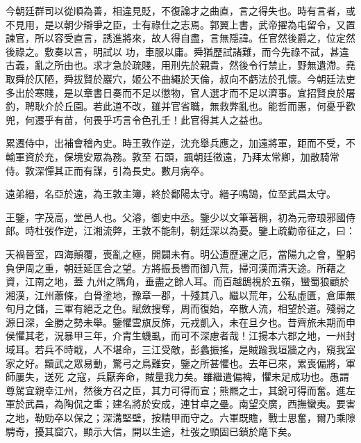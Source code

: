\begin{pinyinscope}
 今朝廷群司以從順為善，相違見貶，不復論才之曲直，言之得失也。時有言者，或不見用，是以朝少辯爭之臣，士有祿仕之志焉。郭翼上書，武帝擢為屯留令，又置諫官，所以容受直言，誘進將來，故人得自盡，言無隱諱。任官然後爵之，位定然後祿之。敷奏以言，明試以
 功，車服以庸。舜猶歷試諸難，而今先祿不試，甚違古義，亂之所由也。求才急於疏賤，用刑先於親貴，然後令行禁止，野無遺滯。堯取舜於仄陋，舜拔賢於巖穴，姬公不曲繩於天倫，叔向不虧法於孔懷。今朝廷法吏多出於寒賤，是以章書日奏而不足以懲物，官人選才而不足以濟事。宜招賢良於屠釣，聘耿介於丘園。若此道不改，雖并官省職，無救弊亂也。能哲而惠，何憂乎歡兜，何遷乎有苗，何畏乎巧言令色孔壬！此官得其人之益也。



 累遷侍中，出補會稽內史。時王敦作逆，沈充舉兵應之，加遠將軍，距而不受，不輸軍資於充，保境安眾為務。敦至
 石頭，諷朝廷徵遠，乃拜太常卿，加散騎常侍。敦深憚其正而有謀，引為長史。數月病卒。



 遠弟縉，名亞於遠，為王敦主簿，終於鄱陽太守。縉子鳴鵠，位至武昌太守。



 王鑒，字茂高，堂邑人也。父濬，御史中丞。鑒少以文筆著稱，初為元帝琅邪國侍郎。時杜弢作逆，江湘流弊，王敦不能制，朝廷深以為憂。鑒上疏勸帝征之，曰：



 天禍晉室，四海顛覆，喪亂之極，開闢未有。明公遭歷運之厄，當陽九之會，聖躬負伊周之重，朝廷延匡合之望。方將振長轡而御八荒，掃河漢而清天途。所藉之資，江南之地，蓋
 九州之隅角，垂盡之餘人耳。而百越鴟視於五嶺，蠻蜀狼顧於湘漢，江州蕭條，白骨塗地，豫章一郡，十殘其八。繼以荒年，公私虛匱，倉庫無旬月之儲，三軍有絕乏之色。賦斂搜奪，周而復始，卒散人流，相望於道。殘弱之源日深，全勝之勢未舉。鑒懼雲旗反旆，元戎凱入，未在旦夕也。昔齊旅未期而申侯懼其老，況暴甲三年，介胄生蟣虱，而可不深慮者哉！江揚本六郡之地，一州封域耳。若兵不時戢，人不堪命，三江受敵，彭蠡振搖，是賊踰我垣牆之內，窺我室家之好。黷武之眾易動，驚弓之鳥難安，鑒之所甚懼也。去年已來，累喪偏將，軍師屢失，送死
 之寇，兵厭奔命，賊量我力矣。雖繼遣偏裨，懼未足成功也。愚謂尊駕宜親幸江州，然後方召之臣，其力可得而宣；熊羆之士，其銳可得而奮。進左軍於武昌，為陶侃之重；建名將於安成，連甘卓之壘。南望交廣，西撫蠻夷。要害之地，勒勁卒以保之；深溝堅壁，按精甲而守之。六軍既贍，戰士思奮，爾乃乘隙騁奇，擾其窟穴，顯示大信，開以生途，杜弢之頸固已鎖於麾下矣。




\end{pinyinscope}

